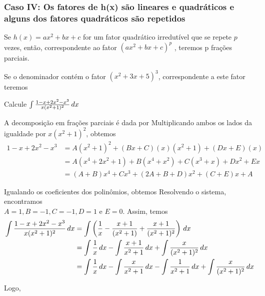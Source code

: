 \cleardoublepage\documentclass[../main.tex]{subfiles}
\begin{document}
\subsubsection*{\hypertarget{FracParcCasoIV}{Caso IV: Os fatores de h(x) são lineares e quadráticos e alguns dos fatores quadráticos são repetidos}}
Se $h(x) = ax^2 +bx +c$ for um fator quadrático irredutível que se repete $p$
vezes, então, correspondente ao fator $(ax^2 + bx + c)^p$ , teremos p frações
parciais.
\begin{ex}
Se o denominador contém o fator $(x^2 + 3x + 5)^3$, correspondente a este fator teremos
\end{ex}

\begin{ex}
Calcule $\int \frac{1-x+2x^2-x^3}{x(x^2+1)^2} \, dx$
\begin{sol}
A decomposição em frações parciais é dada por
Multiplicando ambos os lados da igualdade por $x(x^2 + 1)^2$, obtemos
\begin{align*}
    1 - x + 2x^2 - x^3&  = A(x^2 + 1)^2 + (Bx + C)(x)(x^2 + 1) + (Dx + E)(x)\\
                        & = A(x^4 + 2x^2 + 1) + B(x^4 + x^2) + C(x^3 + x) + Dx^2 + Ex\\
                    & = (A + B)x^4 + Cx^3 + (2A + B + D)x^2 + (C + E)x + A
\end{align*}

Igualando os coeficientes dos polinômios, obtemos
Resolvendo o sistema, encontramos\\
$A = 1, B = -1, C = -1, D = 1 \textrm{ e } E = 0$.
Assim, temos
\begin{align*}
\int \frac{1-x+2x^2-x^3}{x(x^2+1)^2} \, dx&=\int \left(\frac{1}{x}-\frac{x+1}{(x^2+1)}+\frac{x+1}{(x^2+1)^2}\right) \, dx\\
                     &=\int \frac{1}{x} \, dx-\int \frac{x+1}{x^2+1} \, dx+\int \frac{x}{(x^2+1)^2} \, dx\\
                     & =\int \frac{1}{x} \, dx- \int \frac{x}{x^2+1} \, dx- \int \frac{1}{x^2+1} \, dx +\int \frac{x}{(x^2+1)^2} \, dx
\end{align*}

Logo,

\end{sol}
\end{ex}
\end{document}
